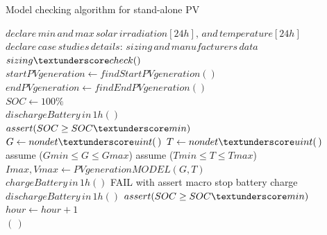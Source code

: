 \documentclass[review]{elsarticle}
\begin{document}
 \begin{algorithm}
 \caption{Model checking algorithm for stand-alone PV}
 \begin{algorithmic}[1]
 \begin{scriptsize}
 
 \renewcommand{\algorithmicrequire}{\textbf{Input:}}
 \renewcommand{\algorithmicensure}{\textbf{Output:}}
  \STATE $declare \, min \, and \, max \, solar \, irradiation[24h], \, and \, temperature[24h]$\\
  \STATE $declare \, case \, studies \, details: \, sizing \, and \, manufacturers \, data $ \\
  \STATE $sizing \textunderscore check()$ \\
  \STATE $startPVgeneration \leftarrow findStartPVgeneration()$ \\
  \STATE $endPVgeneration \leftarrow findEndPVgeneration()$ \\
  \STATE $SOC \leftarrow 100\%$ \\

	  \STATE $dischargeBattery \, in \, 1h()$ \\
	  \STATE $assert (SOC \geq SOC \textunderscore min)$ \\
  \ENDFOR
    \STATE $G \leftarrow nondet \textunderscore uint(\,)$ 
    \STATE $T \leftarrow nondet \textunderscore uint(\,)$ 
    \STATE assume ($Gmin \leq G \leq Gmax$) 
    \STATE assume ($Tmin \leq T \leq Tmax$) 
    \STATE $Imax, Vmax \leftarrow PVgenerationMODEL (G,T)$ \\
      \STATE $chargeBattery \, in \, 1h()$ 
      \STATE FAIL with assert macro 
      \STATE stop battery charge 
      \STATE $dischargeBattery \, in \, 1h()$ 
    \ENDIF
    \STATE $assert (SOC \geq SOC \textunderscore min)$ \\
    \STATE $hour \leftarrow hour+1$ \\
   \ENDFOR
  \ENDFOR
 \RETURN $(\,)$ 
  \end{scriptsize}
 \end{algorithmic} 
 \label{alg:verification-algorithm}
 \end{algorithm}
\end{document}
